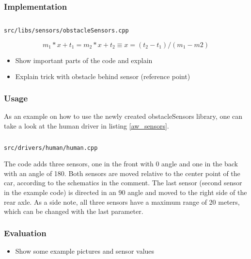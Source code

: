 \documentclass[paper=a4, fontsize=11pt]{scrreprt}
\begin{document}
\subsubsection{Implementation}

\begin{listing}[ht]\label{aw_sensor_position}
  \inputminted[firstline=91,linenos=true,lastline=96,gobble=2]{c++}{../../../simulators/speed-dreams/src/libs/sensors/obstacleSensors.cpp}
  \caption{\texttt{src/libs/sensors/obstacleSensors.cpp}}
\end{listing}

\begin{equation}
  m_1 * x + t_1 = m_2 * x + t_2 \equiv x = (t_2 - t_1) / (m_1 - m2)
\end{equation}


\begin{itemize}
  \item Show important parts of the code and explain
  \item Explain trick with obstacle behind sensor (reference point)
\end{itemize}

\subsubsection{Usage}
As an example on how to use the newly created obstacleSensors library,
one can take a look at the human driver in listing \ref{aw_sensors}.

\begin{listing}[ht]\label{aw_sensors}
  \inputminted[firstline=245,linenos=true,lastline=256,gobble=4]{c++}{../../../simulators/speed-dreams/src/drivers/human/human.cpp}
  \caption{\texttt{src/drivers/human/human.cpp}}
\end{listing}

The code adds three sensors, one in the front with 0\degree{} angle
and one in the back with an angle of 180\degree{}.
Both sensors are moved relative to the center point of the car,
according to the schematics in the comment.
The last sensor (second sensor in the example code) is directed in an 90\degree{} angle
and moved to the right side of the rear axle.
As a side note, all three sensors have a maximum range of 20 meters,
which can be changed with the last parameter.

\subsubsection{Evaluation}
\begin{itemize}
  \item Show some example pictures and sensor values
\end{itemize}
\end{document}

